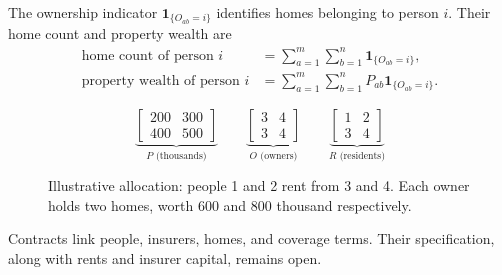\documentclass[11pt]{article}
\begin{document}
The ownership indicator $\mathbf{1}_{\{O_{ab}=i\}}$ identifies homes belonging to person $i$. Their home count and property wealth are
\begin{align}
 \text{home count of person }i &= \sum_{a=1}^{m}\sum_{b=1}^{n}\mathbf{1}_{\{O_{ab}=i\}},\\
 \text{property wealth of person }i &= \sum_{a=1}^{m}\sum_{b=1}^{n}P_{ab}\mathbf{1}_{\{O_{ab}=i\}}.
\end{align}

\begin{figure}[htbp]
\centering
\[
\underbrace{\begin{bmatrix}200&300\\400&500\end{bmatrix}}_{P\text{ (thousands)}}
\qquad
\underbrace{\begin{bmatrix}3&4\\3&4\end{bmatrix}}_{O\text{ (owners)}}
\qquad
\underbrace{\begin{bmatrix}1&2\\3&4\end{bmatrix}}_{R\text{ (residents)}}
\]
\caption{Illustrative allocation: people 1 and 2 rent from 3 and 4. Each owner holds two homes, worth 600 and 800 thousand respectively.}
\label{fig:matrices}
\end{figure}

Contracts link people, insurers, homes, and coverage terms. Their specification, along with rents and insurer capital, remains open.
\end{document}
